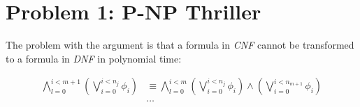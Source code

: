 \section{Problem 1: P-NP Thriller}

The problem with the argument is that a formula in \emph{CNF} cannot be
transformed to a formula in \emph{DNF} in polynomial time:

\begin{align*}
  \bigwedge_{l=0}^{i<m+1} \left( \bigvee_{i=0}^{i<n_j} \phi_i \right) & \equiv
  \bigwedge_{l=0}^{i<m} \left( \bigvee_{i=0}^{i<n_j} \phi_i \right)
  \land \left( \bigvee_{i=0}^{i<n_{m+1}} \phi_i \right) \\
  & \ldots
\end{align*}
